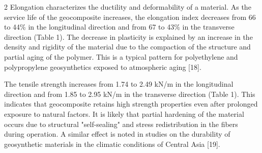 \begin{multicols}{2}
Elongation characterizes the ductility and deformability of a material.
As the service life of the geocomposite increases, the elongation index
decreases from 66 to 44\% in the longitudinal direction and from 67 to
43\% in the transverse direction (Table 1). The decrease in plasticity
is explained by an increase in the density and rigidity of the material
due to the compaction of the structure and partial aging of the polymer.
This is a typical pattern for polyethylene and polypropylene
geosynthetics exposed to atmospheric aging {[}18{]}.

The tensile strength increases from 1.74 to 2.49 kN/m in the
longitudinal direction and from 1.85 to 2.95 kN/m in the transverse
direction (Table 1). This indicates that geocomposite retains high
strength properties even after prolonged exposure to natural factors. It
is likely that partial hardening of the material occurs due to
structural "self-sealing" and stress redistribution in the fibers during
operation. A similar effect is noted in studies on the durability of
geosynthetic materials in the climatic conditions of Central Asia
{[}19{]}.
\end{multicols}

